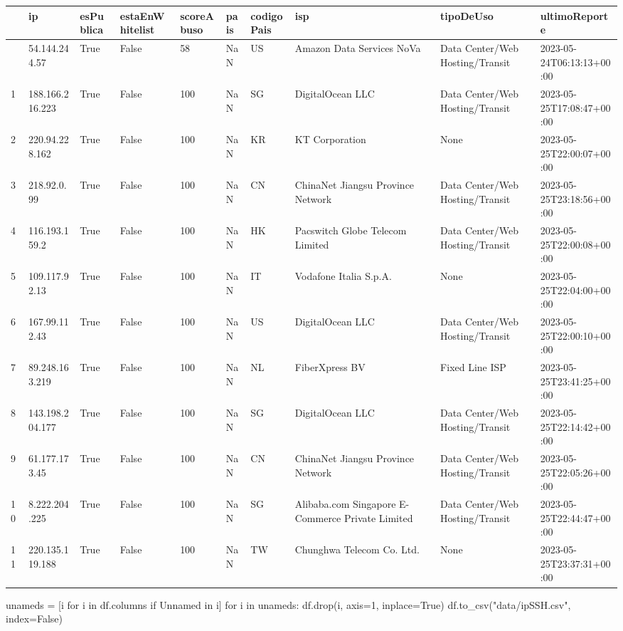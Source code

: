 \documentclass[
  letterpaper,
  DIV=11,
  numbers=noendperiod]{scrartcl}
\newenvironment{Shaded}{\begin{snugshade}}{\end{snugshade}}
\newcommand{\ControlFlowTok}[1]{\textcolor[rgb]{0.00,0.23,0.31}{#1}}
\newcommand{\DecValTok}[1]{\textcolor[rgb]{0.68,0.00,0.00}{#1}}
\newcommand{\KeywordTok}[1]{\textcolor[rgb]{0.00,0.23,0.31}{#1}}
\newcommand{\NormalTok}[1]{\textcolor[rgb]{0.00,0.23,0.31}{#1}}
\newcommand{\OperatorTok}[1]{\textcolor[rgb]{0.37,0.37,0.37}{#1}}
\newcommand{\StringTok}[1]{\textcolor[rgb]{0.13,0.47,0.30}{#1}}
\newcommand{\VariableTok}[1]{\textcolor[rgb]{0.07,0.07,0.07}{#1}}
\begin{document}
\begin{longtable}[]{@{}llllllllll@{}}
\toprule\noalign{}
& ip & esPublica & estaEnWhitelist & scoreAbuso & pais & codigoPais &
isp & tipoDeUso & ultimoReporte \\
\midrule\noalign{}
\endhead
\bottomrule\noalign{}
\endlastfoot
0 & 54.144.244.57 & True & False & 58 & NaN & US & Amazon Data Services
NoVa & Data Center/Web Hosting/Transit & 2023-05-24T06:13:13+00:00 \\
1 & 188.166.216.223 & True & False & 100 & NaN & SG & DigitalOcean LLC &
Data Center/Web Hosting/Transit & 2023-05-25T17:08:47+00:00 \\
2 & 220.94.228.162 & True & False & 100 & NaN & KR & KT Corporation &
None & 2023-05-25T22:00:07+00:00 \\
3 & 218.92.0.99 & True & False & 100 & NaN & CN & ChinaNet Jiangsu
Province Network & Data Center/Web Hosting/Transit &
2023-05-25T23:18:56+00:00 \\
4 & 116.193.159.2 & True & False & 100 & NaN & HK & Pacswitch Globe
Telecom Limited & Data Center/Web Hosting/Transit &
2023-05-25T22:00:08+00:00 \\
5 & 109.117.92.13 & True & False & 100 & NaN & IT & Vodafone Italia
S.p.A. & None & 2023-05-25T22:04:00+00:00 \\
6 & 167.99.112.43 & True & False & 100 & NaN & US & DigitalOcean LLC &
Data Center/Web Hosting/Transit & 2023-05-25T22:00:10+00:00 \\
7 & 89.248.163.219 & True & False & 100 & NaN & NL & FiberXpress BV &
Fixed Line ISP & 2023-05-25T23:41:25+00:00 \\
8 & 143.198.204.177 & True & False & 100 & NaN & SG & DigitalOcean LLC &
Data Center/Web Hosting/Transit & 2023-05-25T22:14:42+00:00 \\
9 & 61.177.173.45 & True & False & 100 & NaN & CN & ChinaNet Jiangsu
Province Network & Data Center/Web Hosting/Transit &
2023-05-25T22:05:26+00:00 \\
10 & 8.222.204.225 & True & False & 100 & NaN & SG & Alibaba.com
Singapore E-Commerce Private Limited & Data Center/Web Hosting/Transit &
2023-05-25T22:44:47+00:00 \\
11 & 220.135.119.188 & True & False & 100 & NaN & TW & Chunghwa Telecom
Co. Ltd. & None & 2023-05-25T23:37:31+00:00 \\
\end{longtable}

\begin{Shaded}
\begin{Highlighting}[]
\NormalTok{unameds }\OperatorTok{=}\NormalTok{ [i }\ControlFlowTok{for}\NormalTok{ i }\KeywordTok{in}\NormalTok{ df.columns }\ControlFlowTok{if} \StringTok{\textquotesingle{}Unnamed\textquotesingle{}} \KeywordTok{in}\NormalTok{ i]}
\ControlFlowTok{for}\NormalTok{ i }\KeywordTok{in}\NormalTok{ unameds:}
\NormalTok{    df.drop(i, axis}\OperatorTok{=}\DecValTok{1}\NormalTok{, inplace}\OperatorTok{=}\VariableTok{True}\NormalTok{)}
\NormalTok{df.to\_csv(}\StringTok{"data/ipSSH.csv"}\NormalTok{, index}\OperatorTok{=}\VariableTok{False}\NormalTok{)}
\end{Highlighting}
\end{Shaded}
\end{document}
